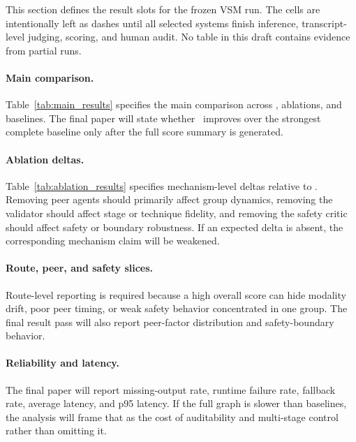\label{sec:result_placeholders}
This section defines the result slots for the frozen VSM run. The cells are intentionally left as dashes until all selected systems finish inference, transcript-level judging, scoring, and human audit. No table in this draft contains evidence from partial runs.

\paragraph{Main comparison.}
Table~\ref{tab:main_results} specifies the main comparison across \trace, ablations, and baselines. The final paper will state whether \tracefull\ improves over the strongest complete baseline only after the full score summary is generated.



\paragraph{Ablation deltas.}
Table~\ref{tab:ablation_results} specifies mechanism-level deltas relative to \tracefull. Removing peer agents should primarily affect group dynamics, removing the validator should affect stage or technique fidelity, and removing the safety critic should affect safety or boundary robustness. If an expected delta is absent, the corresponding mechanism claim will be weakened.



\paragraph{Route, peer, and safety slices.}
Route-level reporting is required because a high overall score can hide modality drift, poor peer timing, or weak safety behavior concentrated in one group. The final result pass will also report peer-factor distribution and safety-boundary behavior.





\paragraph{Reliability and latency.}
The final paper will report missing-output rate, runtime failure rate, fallback rate, average latency, and p95 latency. If the full graph is slower than baselines, the analysis will frame that as the cost of auditability and multi-stage control rather than omitting it.
